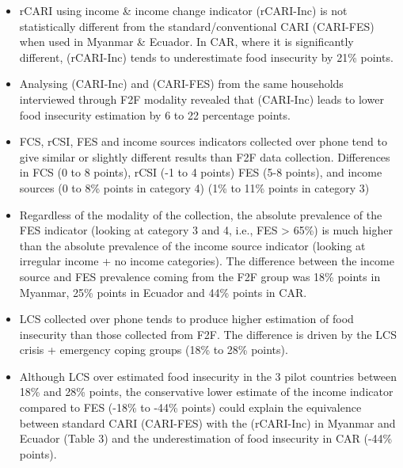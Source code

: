 \documentclass[11pt,harvard]{article}
\begin{document}
\begin{itemize}[label=--, left=1.5em]
	\item[1.]	rCARI using income \& income change indicator (rCARI-Inc) is not statistically different from the standard/conventional CARI (CARI-FES) when used in Myanmar \& Ecuador. In CAR, where it is significantly different, (rCARI-Inc) tends to underestimate food insecurity by 21\% points. 
	
	\item[2.]	Analysing (CARI-Inc) and (CARI-FES) from the same households interviewed through F2F modality revealed that (CARI-Inc) leads to lower food insecurity estimation by 6 to 22 percentage points. 
	
	\item[3.]	FCS, rCSI, FES and income sources indicators collected over phone tend to give similar or slightly different results than F2F data collection. Differences in FCS (0 to 8 points), rCSI (-1 to 4 points) FES (5-8 points), and income sources (0 to 8\% points in category 4) (1\% to 11\% points in category 3)
	
	\item[4.]	Regardless of the modality of the collection, the absolute prevalence of the FES indicator (looking at category 3 and 4, i.e., FES > 65\%) is much higher than the absolute prevalence of the income source indicator (looking at irregular income + no income categories). The difference between the income source and FES prevalence coming from the F2F group was 18\% points in Myanmar, 25\% points in Ecuador and 44\% points in CAR. 
	
	\item[5.] LCS collected over phone tends to produce higher estimation of food insecurity than those	collected from F2F. The difference is driven by the LCS crisis + emergency coping groups (18\% to 28\% points).
	
	\item[6.]	Although LCS over estimated food insecurity in the 3 pilot countries between 18\% and 28\% points, the conservative lower estimate of the income indicator compared to FES (-18\% to -44\% points) could explain the equivalence between standard CARI (CARI-FES) with the (rCARI-Inc) in Myanmar and Ecuador (Table 3) and the underestimation of food insecurity in CAR (-44\% points). 
	
\end{itemize}


\pagebreak

\end{document}
